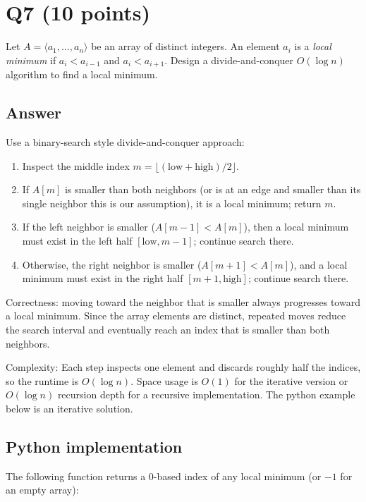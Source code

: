 \documentclass[12pt]{article}
\begin{document}
\section*{Q7 (10 points)}
Let $A = \langle a_1, \dots, a_n \rangle$ be an array of distinct integers. An element $a_i$ is a \emph{local minimum} if $a_i < a_{i-1}$ and $a_i < a_{i+1}$. Design a divide-and-conquer $O(\log n)$ algorithm to find a local minimum.

\subsection*{Answer}
Use a binary-search style divide-and-conquer approach:
\begin{enumerate}
  \item Inspect the middle index $m = \lfloor (\text{low} + \text{high})/2 \rfloor$.
  \item If $A[m]$ is smaller than both neighbors (or is at an edge and smaller than its single neighbor this is our assumption), it is a local minimum; return $m$.
  \item If the left neighbor is smaller ($A[m-1] < A[m]$), then a local minimum must exist in the left half $[\text{low}, m-1]$; continue search there.
  \item Otherwise, the right neighbor is smaller ($A[m+1] < A[m]$), and a local minimum must exist in the right half $[m+1, \text{high}]$; continue search there.
\end{enumerate}

Correctness: moving toward the neighbor that is smaller always progresses toward a local minimum. Since the array elements are distinct, repeated moves reduce the search interval and eventually reach an index that is smaller than both neighbors.

Complexity: Each step inspects one element and discards roughly half the indices, so the runtime is $O(\log n)$. Space usage is $O(1)$ for the iterative version or $O(\log n)$ recursion depth for a recursive implementation. The python example below is an iterative solution.

\subsection*{Python implementation}
The following function returns a 0-based index of any local minimum (or $-1$ for an empty array):
\end{document}

